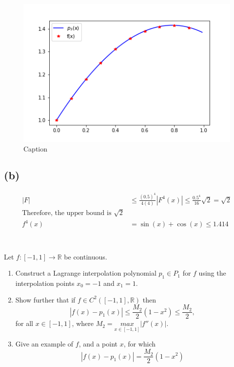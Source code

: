 \documentclass{article}
\begin{document}
\begin{figure}[H]
    \centering
    \includegraphics[width = .8 \linewidth]{images/hw05q01b.png}
    \caption{Caption}
    \label{fig:my_label}
\end{figure}

\subsection*{(b)}

\begin{align*}
    |F| &\le \frac{(0.5)^4}{4(4)}|F^4(x)| \le \frac{0.5^4}{16}\sqrt{2} = \sqrt{2}\\
    \text{Therefore, the upper bound is $\sqrt{2}$}\\
    f^4(x) &= \sin(x) + \cos(x) \le 1.414\\
\end{align*}


\section{}
Let $f: [-1,1] \to \mathbb{R}$ be continuous.
\begin{enumerate}[label = (\alph*)]
    \item Construct a Lagrange interpolation polynomial $p_1 \in P_1$ for $f$ using the interpolation points $x_0 = -1$ and $x_1 = 1$.
    \item Show further that if $f \in C^2([-1,1], \mathbb{R})$ then $$|f(x)-p_1(x)| \le \frac{M_2}{2}(1-x^2) \le \frac{M_2}{2},$$
    for all $x \in [-1,1]$, where $M_2 = \underset{x \in [-1,1]}{max} |f''(x)|$.
    \item Give an example of $f$, and a point $x$, for which
    $$|f(x)-p_1(x)|= \frac{M_2}{2}(1-x^2)$$
\end{enumerate}
\vspace{10mm}
\end{document}
